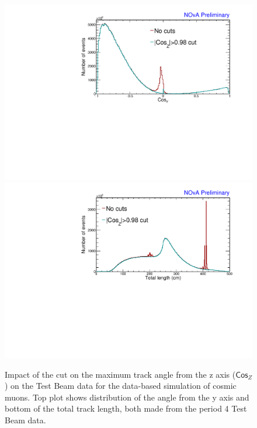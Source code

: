 \begin{enumerate}
\begin{figure}[!ht]
\includegraphics[width=\textwidth]{Plots/TBCalibration/DBSim_SelectionComparisonCosZCut_CosY.pdf}
\includegraphics[width=\textwidth]{Plots/TBCalibration/DBSim_SelectionComparisonCosZCut_TotLength.pdf}
\caption[$\textsf{Cos}_Z$ cut for data-based simulation selection]{Impact of the cut on the maximum track angle from the z axis ($\textsf{Cos}_Z$) on the Test Beam data for the data-based simulation of cosmic muons. Top plot shows distribution of the angle from the y axis and bottom of the total track length, both made from the period 4 Test Beam data.}
\label{fig:DataBasedSimCosZSelectionComparison}
\end{figure}


\end{enumerate}
